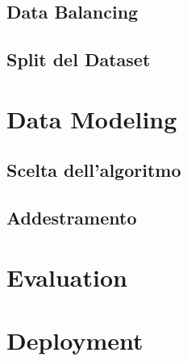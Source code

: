 \documentclass{article}
\begin{document}
    \subsection{Data Balancing}
    \subsection{Split del Dataset}

\newpage
\section{Data Modeling}
    \subsection{Scelta dell'algoritmo}
    \subsection{Addestramento}

\newpage
\section{Evaluation}

\newpage
\section{Deployment}
\end{document}
